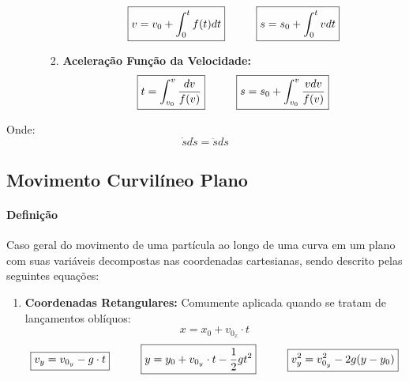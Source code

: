 \documentclass{article}
\begin{document}
\begin{enumerate}[noitemsep]
\begin{enumerate}[noitemsep]
\begin{enumerate}[noitemsep]
                                        \[
                                            \boxed{v = v_{0} + \int_{0}^{t} f(t) dt}
                                            \hspace{10mm}
                                            \boxed{s = s_{0} + \int_{0}^{t} v dt}
                                        \]
                                    \item \textbf{Aceleração Função da Velocidade:}
                                        \[
                                            \boxed{t = \int_{v_{0}}^{v} \frac{dv}{f(v)}}
                                            \hspace{10mm}
                                            \boxed{s = s_{0} + \int_{v_{0}}^{v} \frac{v dv}{f(v)}}
                                        \]
                                \end{enumerate}
                        \end{enumerate}
                \end{enumerate}
            Onde:
                \begin{equation}
                    \boxed{
                        \dot{s} d\dot{s} = \ddot{s} ds
                    }
                \end{equation}

        \subsection{Movimento Curvilíneo Plano}
            \paragraph{Definição}Caso geral do movimento de uma partícula ao longo de uma curva em um plano com suas variáveis decompostas nas coordenadas cartesianas, sendo descrito pelas seguintes equações:
                \begin{enumerate}[noitemsep]
                    \item \textbf{Coordenadas Retangulares:} Comumente aplicada quando se tratam de lançamentos oblíquos:
                        \[
                            \boxed{x = x_{0} + v_{0_{x}} \cdot t}
                        \]
                        \[
                            \boxed{v_{y} = v_{0_{y}} - g \cdot t}
                            \hspace{10mm}
                            \boxed{y = y_{0} + v_{0_{y}} \cdot t - \frac{1}{2}g t^{2}}
                            \hspace{10mm}
                            \boxed{v_{y}^{2} = v_{0_{y}}^{2} - 2g(y - y_{0})}
                        \]
                \end{enumerate}
\end{document}
